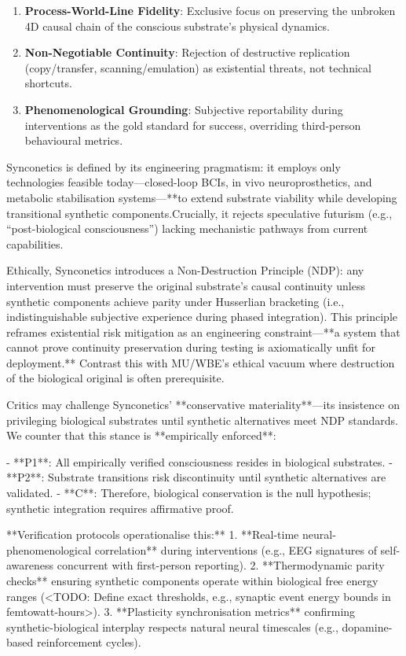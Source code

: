 \documentclass[10pt]{article}
\begin{document}
\begin{sloppypar}
  \begin{enumerate}
    \item \textbf{Process-World-Line Fidelity}: Exclusive focus on preserving the unbroken 4D causal chain of the conscious substrate’s physical dynamics.
    \item \textbf{Non-Negotiable Continuity}: Rejection of destructive replication (copy/transfer, scanning/emulation) as existential threats, not technical shortcuts.
    \item \textbf{Phenomenological Grounding}: Subjective reportability during interventions as the gold standard for success, overriding third-person behavioural metrics.
  \end{enumerate}

  Synconetics is defined by its engineering pragmatism: it employs only technologies feasible today—closed-loop BCIs, in vivo neuroprosthetics, and metabolic stabilisation systems—**to extend substrate viability while developing transitional synthetic components.Crucially, it rejects speculative futurism (e.g., “post-biological consciousness”) lacking mechanistic pathways from current capabilities.

  Ethically, Synconetics introduces a Non-Destruction Principle (NDP): any intervention must preserve the original substrate’s causal continuity unless synthetic components achieve parity under Husserlian bracketing (i.e., indistinguishable subjective experience during phased integration). This principle reframes existential risk mitigation as an engineering constraint—**a system that cannot prove continuity preservation during testing is axiomatically unfit for deployment.** Contrast this with MU/WBE’s ethical vacuum where destruction of the biological original is often prerequisite.

  Critics may challenge Synconetics’ **conservative materiality**—its insistence on privileging biological substrates until synthetic alternatives meet NDP standards. We counter that this stance is **empirically enforced**:

  - **P1**: All empirically verified consciousness resides in biological substrates.
  - **P2**: Substrate transitions risk discontinuity until synthetic alternatives are validated.
  - **C**: Therefore, biological conservation is the null hypothesis; synthetic integration requires affirmative proof.

  **Verification protocols operationalise this:**
  1. **Real-time neural-phenomenological correlation** during interventions (e.g., EEG signatures of self-awareness concurrent with first-person reporting).
  2. **Thermodynamic parity checks** ensuring synthetic components operate within biological free energy ranges (<TODO: Define exact thresholds, e.g., synaptic event energy bounds in femtowatt-hours>).
  3. **Plasticity synchronisation metrics** confirming synthetic-biological interplay respects natural neural timescales (e.g., dopamine-based reinforcement cycles).


\end{sloppypar}
\end{document}
